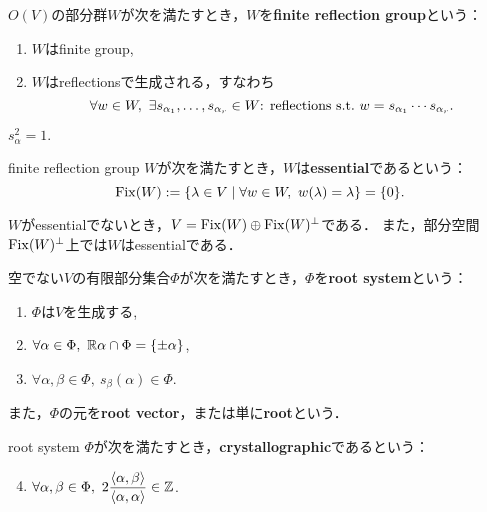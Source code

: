 \begin{defi}
  $O(V)$の部分群$W$が次を満たすとき，$W$を\textbf{finite reflection group}という：
  \begin{enumerate}[label=(\roman*)]
    \item $W$はfinite group,
    \item $W$はreflectionsで生成される，すなわち
    \begin{equation}
      \forall w \in W,\ \exists s_{\alpha_1}, \ldots, s_{\alpha_r} \in W \textrm{: reflections} \ \text{s.t.}\  w = s_{\alpha_1} \cdots s_{\alpha_r}.
    \end{equation}
  \end{enumerate}
\end{defi}

\begin{rem}
  $s_\alpha^2 = 1.$
\end{rem}

\begin{defi}
  finite reflection group $W$が次を満たすとき，$W$は\textbf{essential}であるという：
  \begin{equation}
    \operatorname{Fix}(W) := \left\lbrace \lambda \in V \mathrel{} \middle| \mathrel{} \forall w \in W,\ w(\lambda) = \lambda \right\rbrace = \{0\}.
  \end{equation}
\end{defi}

\begin{rem}
  $W$がessentialでないとき，$V = \operatorname{Fix}(W) \oplus \operatorname{Fix}(W)^\perp$である．
  また，部分空間$\operatorname{Fix}(W)^\perp$上では$W$はessentialである．
\end{rem}

\begin{defi}
  空でない$V$の有限部分集合$\Phi$が次を満たすとき，$\Phi$を\textbf{root system}という：
  \begin{enumerate}[label=(\roman*)]
    \item $\Phi$は$V$を生成する, \label{defi:root_gen}
    \item $\forall \alpha \in \Phi,\ \mathbb{R} \alpha \cap \Phi = \{\pm \alpha\}$, \label{defi:root_self}
    \item $\forall \alpha, \beta \in \Phi,\ s_\beta(\alpha) \in \Phi$. \label{defi:root_ref_closed}
  \end{enumerate}
  また，$\Phi$の元を\textbf{root vector}，または単に\textbf{root}という．
\end{defi}

\begin{defi}
  root system $\Phi$が次を満たすとき，\textbf{crystallographic}であるという：
  \begin{enumerate}[label=(\roman*)]
    \setcounter{enumi}{3}
    \item $\forall \alpha, \beta \in \Phi,\ 2 \dfrac{\left\langle \alpha, \beta \right\rangle}{\left\langle \alpha, \alpha \right\rangle} \in \mathbb{Z}$.
  \end{enumerate}
\end{defi}

